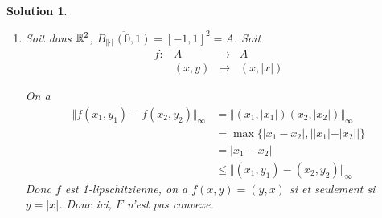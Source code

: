 \documentclass[12pt]{article}
\newtheorem{solution}{Solution}[section]
\theoremstyle{remark}
\newcommand{\function}[5]{
	$$
	\begin{array}{rccl}
		#1: & #2 & \to & #3 \\
		& #4 & \mapsto & #5
	\end{array}
	$$
}
\begin{document}
\begin{solution}
\begin{enumerate}
		Comme la norme est euclidienne, il existe $\lambda\in\R_{+}$ tel que $f(x)-f(z)=\lambda(f(z)-f(y))$ d'où $f(x)+\lambda f(y)=(\lambda+1)f(z)$ d'où $f(z)=\frac{x+\lambda y}{\lambda+1}=t'x+(1-t')y$ avec $t'=\frac{1}{\lambda+1}\in[0,1]$. En reportant, on a 
		$$\Vert f(x)-f(z))\Vert=\Vert x-t'x-(1-t')y\Vert=(1-t')\Vert x-y\Vert=\Vert x-z\Vert=(1-t)\Vert x-y\Vert$$
		Si $x\neq y$, alors $t=t'$ et $f(z)=tx+(1-t)y=z$.

		\item Soit dans $\mathbb{R}^{2}$, $\overline{B_{\Vert\cdot\Vert}(0,1)}=[-1,1]^{2}=A$. Soit \function{f}{A}{A}{(x,y)}{(x,\vert x\vert)}
		On a 
		\begin{align*}
			\Vert f(x_{1},y_{1})-f(x_{2},y_{2})\Vert_{\infty}
			&= \Vert (x_{1},\vert x_{1}\vert)(x_{2},\vert x_{2}\vert)\Vert_{\infty}\\
			&=\max\{\vert x_{1}-x_{2}\vert, \bigl\vert\vert x_{1}\vert-\vert x_{2}\vert\bigr\vert\}\\
			&=\vert x_{1}-x_{2}\vert\\
			&\leqslant\Vert (x_{1},y_{1})-(x_{2},y_{2})\Vert_{\infty}
		\end{align*}
		Donc $f$ est 1-lipschitzienne, on a $f(x,y)=(y,x)$ si et seulement si $y=\vert x\vert$. Donc ici, $F$ n'est pas convexe.
	\end{enumerate}
\end{solution}
\end{document}
